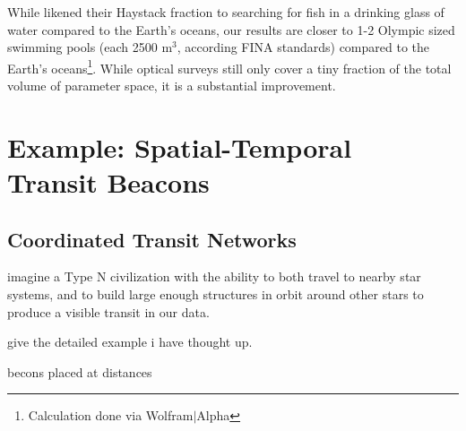 \documentclass[twocolumn]{aastex62}
\newcommand{\Kepler}{\textsl{Kepler}\xspace}
\begin{document}
While \citet{wright2018c} likened their Haystack fraction to searching for fish in a drinking glass of water compared to the Earth's oceans, our results are closer to 1-2 Olympic sized swimming pools (each 2500 m$^3$, according FINA standards) compared to the Earth's oceans\footnote{Calculation done via Wolfram$|$Alpha}. While optical surveys still only cover a tiny fraction of the total volume of parameter space, it is a substantial improvement.

%
%








\section{Example: Spatial-Temporal\\ Transit Beacons}
\label{sec:transit}


\subsection{Coordinated Transit Networks}
imagine a Type N civilization with the ability to both travel to nearby star systems, and to build large enough structures in orbit around other stars to produce a visible transit in our data.

give the detailed example i have thought up.

becons placed at distances
\end{document}
